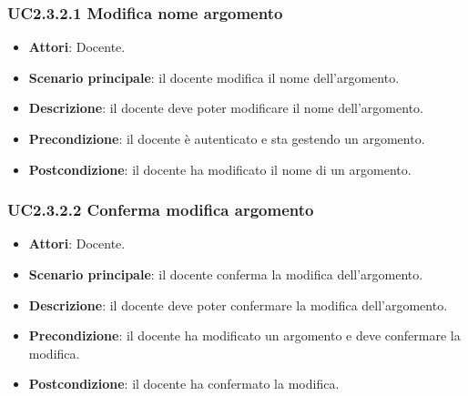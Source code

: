 \subsubsection{UC2.3.2.1 Modifica nome argomento}
\begin{itemize}
\item \textbf{Attori}: Docente.
\item \textbf{Scenario principale}: il docente modifica il nome dell'argomento.
\item \textbf{Descrizione}: il docente deve poter modificare il nome dell'argomento.
\item \textbf{Precondizione}: il docente è autenticato e sta gestendo un argomento.
\item \textbf{Postcondizione}: il docente ha modificato il nome di un argomento.
\end{itemize}
\subsubsection{UC2.3.2.2 Conferma modifica argomento}
\begin{itemize}
\item \textbf{Attori}: Docente.
\item \textbf{Scenario principale}: il docente conferma la modifica dell'argomento.
\item \textbf{Descrizione}: il docente deve poter confermare la modifica dell'argomento.
\item \textbf{Precondizione}: il docente ha modificato un argomento e deve confermare la modifica.
\item \textbf{Postcondizione}: il docente ha confermato la modifica.
\end{itemize}
